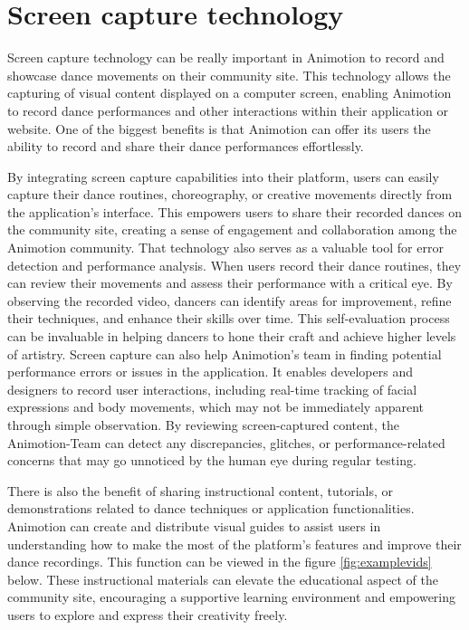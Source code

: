 \section{Screen capture technology}
Screen capture technology can be really important in Animotion to record and showcase dance movements on their 
community site. This technology allows the capturing of visual content displayed on a computer screen, enabling Animotion to 
record dance performances and other interactions within their application or website. One of the biggest benefits is that Animotion can offer
its users the ability to record and share their dance performances effortlessly. 

By integrating screen capture capabilities into their platform, users can easily capture their dance routines, choreography, or creative 
movements directly from the application's interface. This empowers users to share their recorded dances on the community site, creating a 
sense of engagement and collaboration among the Animotion community. That technology also serves as a valuable tool for error 
detection and performance analysis. When users record their dance routines, they can review their movements and assess their 
performance with a critical eye. By observing the recorded video, dancers can identify areas for improvement, refine their 
techniques, and enhance their skills over time. This self-evaluation process can be invaluable in helping dancers to 
hone their craft and achieve higher levels of artistry. Screen capture can also help Animotion's team in finding potential 
performance errors or issues in the application. It enables developers and designers to record user interactions, including real-time 
tracking of facial expressions and body movements, which may not be immediately apparent through simple observation. 
By reviewing screen-captured content, the Animotion-Team can detect any discrepancies, glitches, or performance-related 
concerns that may go unnoticed by the human eye during regular testing.

There is also the benefit of sharing instructional content, tutorials, or demonstrations related to dance techniques or 
application functionalities. Animotion can create and distribute visual guides to assist users in understanding how to make the most of the 
platform's features and improve their dance recordings. This function can be viewed in the figure \ref{fig:examplevids} below. These instructional materials can elevate 
the educational aspect of the community site, encouraging a supportive learning environment and empowering users to explore and express their creativity freely.

